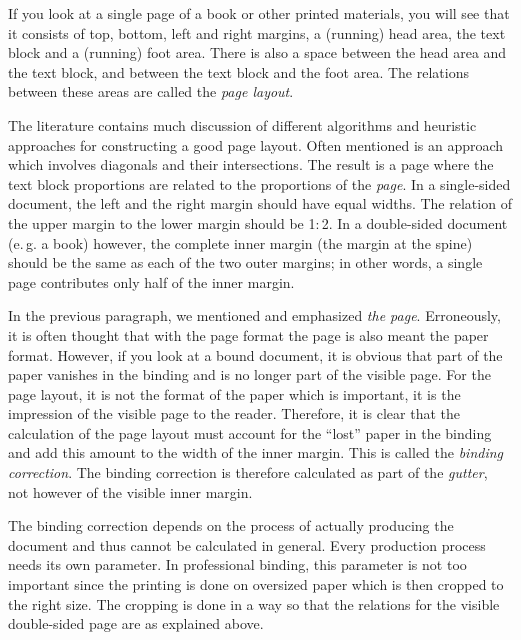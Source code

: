 \begin{Explain}
  If you look at a single page of a book or other printed materials,
  you will see that it consists of top, bottom, left and right
  margins, a (running) head area, the text block and a (running) foot
  area.  There is also a space between the head area and the text
  block, and between the text block and the foot area. The relations
  between these areas are called the \emph{page
    layout}.

  The literature contains much discussion of different algorithms and
  heuristic approaches for constructing a good page layout.  Often
  mentioned is an approach which involves diagonals and their
  intersections. The result is a page where the text block proportions
  are related to the proportions of the \emph{page}.  In a
  single-sided document, the left and the right margin should have
  equal widths.  The relation of the upper margin to the lower margin
  should be 1\(:\)2. In a double-sided document
  (e.\,g. a book) however, the complete inner margin (the margin at
  the spine) should be the same as each of the two outer margins; in
  other words, a single page contributes only half of the inner
  margin.

  In the previous paragraph, we mentioned and emphasized \emph{the
    page}. Erroneously, it is often thought that with the page format
  the page is also meant the paper format. However, if you look at a bound document, it is obvious
  that part of the paper vanishes in the
  binding and is no longer part of the
  visible page. For the page layout, it is not the format of the paper
  which is important, it is the impression of the visible page to the
  reader. Therefore, it is clear that the calculation of the page
  layout must account for the ``lost'' paper in the binding and add
  this amount to the width of the inner margin. This is called the
  \emph{binding correction}. The
  binding correction is therefore calculated as part of the
  \emph{gutter}, not however of the visible
  inner margin.

  The binding correction depends on the process of actually
  producing the document and thus cannot be calculated in general.
  Every production process needs its own parameter. In professional
  binding, this parameter is not too important since the printing is
  done on oversized paper which is then cropped to the right size.
  The cropping is done in a way so that the relations for the
  visible double-sided page are as explained above.


\end{Explain}
